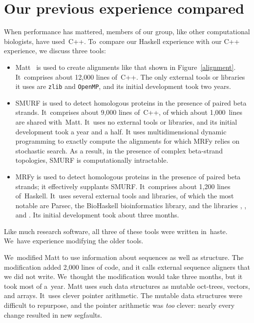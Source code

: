 \documentclass[nonatbib,preprint,blockstyle,times]{sigplanconf}
\newcommand\figref[1]{Figure~\ref{#1}}
\newcommand\seclabel[1]{\label{sec:#1}}
\let\cite\citep
\begin{document}
 
 
\section{Our previous experience compared}
\seclabel{comparo}

When performance has mattered, members of our group, like other
computational biologists, have used~C++.
To~compare our Haskell experience with our C++ experience,
we discuss three tools:
\begin{itemize}
\item
Matt~\cite{Menke:2008wu} is used to create alignments like that shown
in \figref{alignment}.
It~comprises about 12,000 lines of~C++.
The only external tools or libraries it uses are \texttt{zlib}
and \texttt{OpenMP}, and its initial development took two years.
\item
SMURF
\cite{Menke:2010ti} is used to detect homologous proteins in the presence
of paired beta strands.
It~comprises about 9,000 lines of~C++, of which about 1,000~lines are
shared with~Matt.
It~uses no external tools or libraries, and
its initial development took a year and a half.
It uses multidimensional dynamic programming to exactly compute the alignments
for which MRFy relies on stochastic search.
As a result, in the presence of complex beta-strand topologies, SMURF is
computationally intractable.
\item
MRFy is used to detect homologous proteins in the presence of paired
beta strands; it effectively supplants SMURF.
It~comprises about 1,200 lines of~Haskell.
It~uses several external tools and libraries, of which the most
notable are Parsec, the BioHaskell bioinformatics library, and
the libraries , ,
and .
Its initial development took about three months.
\end{itemize}
Like much research software, all three of these tools were written
 in~haste.
We~have experience modifying the older tools.



We~modified Matt to use information about sequences as well as structure.
The modification added 2,000 lines of code, and it calls
external sequence aligners that we did not write.
We~thought the modification would take three months, 
but it took most of a~year.
Matt uses such
data structures as mutable oct-trees, vectors, and arrays.
It~uses clever pointer arithmetic.
The mutable data structures were difficult to 
repurpose, and the pointer arithmetic was \emph{too} clever: 
nearly every change resulted in new segfaults.
\end{document}
